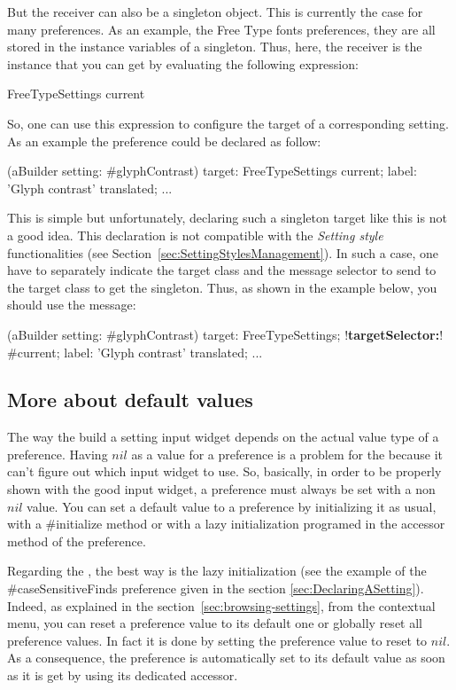 \documentclass[a4paper,10pt,twoside]{book}
\begin{document}
But the receiver can also be a singleton object. This is currently the case for many preferences. As an example, the Free Type fonts preferences, they are all stored in the instance variables of a  singleton. Thus, here, the receiver is the  instance that you can get by evaluating the following expression:
\begin{code}{}
FreeTypeSettings current
\end{code}
So, one can use this expression  to configure the target of a corresponding setting. As an example the  preference could be declared as follow:
\begin{code}{}
(aBuilder setting: #glyphContrast) 
	target: FreeTypeSettings current;
	label: 'Glyph contrast' translated;
    ...
\end{code}
This is simple but unfortunately, declaring such a singleton target like this is not a good idea. This declaration is not compatible with the \textit{Setting style} functionalities (see Section~\ref{sec:SettingStylesManagement}). In such a case, one have to separately indicate the target class and the message selector to send to the target class to get the singleton. Thus, as shown in the example below, you should use the  message:

\begin{code}{}
(aBuilder setting: #glyphContrast) 
	target: FreeTypeSettings;
	!\textbf{targetSelector:}! #current;
	label: 'Glyph contrast' translated;
    ...
\end{code}

\subsection{More about default values}
The way the \setbrowser build a setting input widget depends on the actual value type of a preference. Having $nil$ as a value for a preference is a problem for the \setbrowser because it can't figure out which input widget to use.
So, basically, in order to be properly shown with the good input widget, a preference must always be set with a non $nil$ value.
You can set a default value to a preference by initializing it as usual, with a \#initialize method or with a lazy initialization programed in the accessor method of the preference. 

Regarding the \setbrowser, the best way is the lazy initialization (see the example of the \#caseSensitiveFinds preference given in the section \ref{sec:DeclaringASetting}).
Indeed, as explained in the section~\ref{sec:browsing-settings}, from the \setbrowser contextual menu, you can reset a preference value to its default one or globally reset all preference values. In fact it is done by setting the preference value to reset to $nil$. As a consequence, the preference is automatically set to its default value as soon as it is get by using its dedicated accessor.
\end{document}

